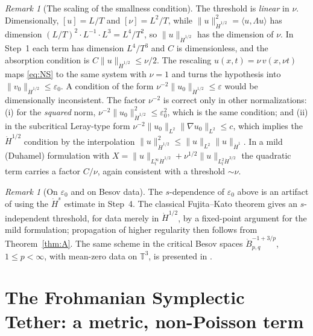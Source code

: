 \documentclass[11pt,reqno]{amsart}
\theoremstyle{definition}
\theoremstyle{remark}
\newtheorem{remark}[lemma]{Remark}
\newcommand{\T}{\mathbb{T}^3}
\newcommand{\dH}[1]{\dot H^{#1}}
\newcommand{\norm}[1]{\lVert #1\rVert}
\newcommand{\ip}[2]{\langle #1,#2\rangle}
\begin{document}
\begin{remark}[The scaling of the smallness condition]\label{rem:scaling}
The threshold is \emph{linear} in $\nu$. Dimensionally, $[u]=L/T$ and $[\nu]=L^2/T$, while $\norm{u}_{\dH{1/2}}^2=\ip{u}{\Lambda u}$ has dimension $(L/T)^2\cdot L^{-1}\cdot L^3=L^4/T^2$, so $\norm{u}_{\dH{1/2}}$ has the dimension of $\nu$. In Step~1 each term has dimension $L^4/T^3$ and $C$ is dimensionless, and the absorption condition is $C\norm{u}_{\dH{1/2}}\le\nu/2$. The rescaling $u(x,t)=\nu\,v(x,\nu t)$ maps \eqref{eq:NS} to the same system with $\nu=1$ and turns the hypothesis into $\norm{v_0}_{\dH{1/2}}\le\varepsilon_0$. A condition of the form $\nu^{-2}\norm{u_0}_{\dH{1/2}}\le\varepsilon$ would be dimensionally inconsistent. The factor $\nu^{-2}$ is correct only in other normalizations: (i) for the \emph{squared} norm, $\nu^{-2}\norm{u_0}_{\dH{1/2}}^2\le\varepsilon_0^2$, which is the same condition; and (ii) in the subcritical Leray-type form $\nu^{-2}\norm{u_0}_{L^2}\norm{\nabla u_0}_{L^2}\le c$, which implies the $\dH{1/2}$ condition by the interpolation $\norm{u}_{\dH{1/2}}^2\le\norm{u}_{L^2}\norm{u}_{\dH{1}}$. In a mild (Duhamel) formulation with $X=\norm{u}_{L^\infty_t\dH{1/2}}+\nu^{1/2}\norm{u}_{L^2_t\dH{3/2}}$ the quadratic term carries a factor $C/\nu$, again consistent with a threshold $\sim\nu$.
\end{remark}

\begin{remark}[On $\varepsilon_0$ and on Besov data]\label{rem:eps}
The $s$-dependence of $\varepsilon_0$ above is an artifact of using the $\dH{s}$ estimate in Step~4. The classical Fujita--Kato theorem \cite{FujitaKato1964} gives an $s$-independent threshold, for data merely in $\dH{1/2}$, by a fixed-point argument for the mild formulation; propagation of higher regularity then follows from Theorem~\ref{thm:A}. The same scheme in the critical Besov spaces $\dot B^{-1+3/p}_{p,q}$, $1\le p<\infty$, with mean-zero data on $\T$, is presented in \cite[Ch.~5]{BCD2011}.
\end{remark}

\section{The Frohmanian Symplectic Tether: a metric, non-Poisson term}\label{sec:tether}
\end{document}
